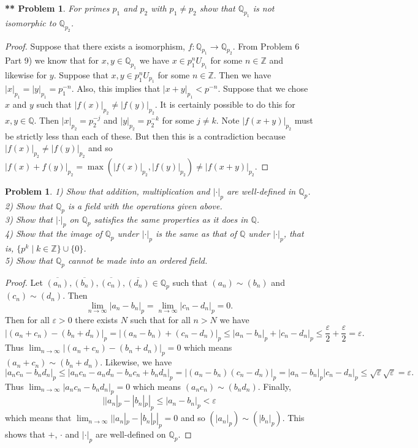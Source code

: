 \documentclass{article}
\newtheorem{problem}{Problem}
\newtheorem{**}{** Problem}
\begin{document}
\begin{flushleft}
\begin{**}
For primes $p_1$ and $p_2$ with $p_1 \neq p_2$ show that $\mathbb{Q}_{p_1}$ is not isomorphic to $\mathbb{Q}_{p_2}$.
\end{**}
\begin{proof}
Suppose that there exists a isomorphism, $f : \mathbb{Q}_{p_1} \rightarrow \mathbb{Q}_{p_2}$. From Problem 6 Part 9) we know that for $x, y \in \mathbb{Q}_{p_1}$ we have $x \in p_1^n U_{p_1}$ for some $n \in \mathbb{Z}$ and likewise for $y$. Suppose that $x, y \in p_1^n U_{p_1}$ for some $n \in \mathbb{Z}$. Then we have $|x|_{p_1} = |y|_{p_1} = p_1^{-n}$. Also, this implies that $|x+y|_{p_1} < p^{-n}$. Suppose that we chose $x$ and $y$ such that $|f(x)|_{p_2} \neq |f(y)|_{p_2}$. It is certainly possible to do this for $x, y \in \mathbb{Q}$. Then $|x|_{p_2} = p_2^{-j}$ and $|y|_{p_2} = p_2^{-k}$ for some $j \neq k$. Note $|f(x + y)|_{p_2}$ must be strictly less than each of these. But then this is a contradiction because $|f(x)|_{p_2} \neq |f(y)|_{p_2}$ and so $|f(x) + f(y)|_{p_2} = \max (|f(x)|_{p_2}, |f(y)|_{p_2}) \neq |f(x+y)|_{p_2}$.
\end{proof}

\begin{problem}
1) Show that addition, multiplication and $| \cdot |_p$ are well-defined in $\mathbb{Q}_p$.\\
2) Show that $\mathbb{Q}_p$ is a field with the operations given above.\\
3) Show that $| \cdot |_p$ on $\mathbb{Q}_p$ satisfies the same properties as it does in $\mathbb{Q}$.\\
4) Show that the image of $\mathbb{Q}_p$ under $| \cdot |_p$ is the same as that of $\mathbb{Q}$ under $| \cdot |_p$, that is, $\{p^k \mid k \in \mathbb{Z}\} \cup \{0\}$.\\
5) Show that $\mathbb{Q}_p$ cannot be made into an ordered field.
\end{problem}
\begin{proof}
Let $\overline{(a_n)}, \overline{(b_n)}, \overline{(c_n)}, \overline{(d_n)} \in \mathbb{Q}_p$ such that $(a_n) \sim (b_n)$ and $(c_n) \sim (d_n)$. Then
\[
\lim_{n \rightarrow \infty} |a_n - b_n|_p = \lim_{n \rightarrow \infty} |c_n - d_n|_p = 0.
\]
Then for all $\varepsilon > 0$ there exists $N$ such that for all $n > N$ we have
\[
|(a_n + c_n) - (b_n + d_n)|_p = |(a_n - b_n) + (c_n - d_n)|_p \leq |a_n - b_n|_p + |c_n - d_n|_p \leq \frac{\varepsilon}{2} + \frac{\varepsilon}{2} = \varepsilon.
\]
Thus $\lim_{n \rightarrow \infty} |(a_n + c_n) - (b_n + d_n)|_p = 0$ which means $(a_n + c_n) \sim (b_n + d_n)$. Likewise, we have
\[
|a_n c_n - b_n d_n|_p \leq |a_n c_n - a_n d_n - b_n c_n + b_n d_n|_p = |(a_n - b_n)(c_n - d_n)|_p = |a_n - b_n|_p |c_n - d_n|_p \leq \sqrt{\varepsilon} \sqrt{\varepsilon} = \varepsilon.
\]
Thus $\lim_{n \rightarrow \infty} |a_n c_n - b_n d_n|_p = 0$ which means $(a_n c_n) \sim (b_n d_n)$. Finally,
\[
||a_n|_p - |b_n|_p|_p \leq |a_n - b_n|_p < \varepsilon
\]
which means that $\lim_{n \rightarrow \infty} ||a_n|_p - |b_n|_p|_p = 0$ and so $(|a_n|_p) \sim (|b_n|_p)$. This shows that $+$, $\cdot$ and $| \cdot |_p$ are well-defined on $\mathbb{Q}_p$.\newline


\end{proof}
\end{flushleft}
\end{document}
